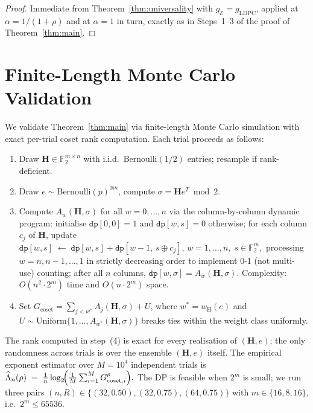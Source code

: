 \documentclass[journal,10pt,onecolumn]{IEEEtran}
\newcommand{\wH}{w_{\mathrm{H}}}
\newcommand{\Hm}{\mathbf{H}}
\begin{document}
\begin{proof}
Immediate from Theorem~\ref{thm:universality} with
$g_{\mathcal{E}}=g_{\mathrm{LDPC}}$, applied at $\alpha=1/(1+\rho)$ and at
$\alpha=1$ in turn, exactly as in Steps~1--3 of the proof of
Theorem~\ref{thm:main}.
\end{proof}

\section{Finite-Length Monte Carlo Validation}
\label{sec:numerical}

We validate Theorem~\ref{thm:main} via finite-length Monte Carlo
simulation with exact per-trial coset rank computation.
Each trial proceeds as follows:
\begin{enumerate}
\item Draw $\Hm\in\mathbb{F}_2^{m\times n}$ with i.i.d.\
      Bernoulli$(1/2)$ entries; resample if rank-deficient.
\item Draw $e\sim\mathrm{Bernoulli}(p)^{\otimes n}$, compute
      $\sigma=\Hm e^{T}\bmod 2$.
\item Compute $A_w(\Hm,\sigma)$ for all $w=0,\ldots,n$ via the
      column-by-column dynamic program: initialise
      $\mathtt{dp}[0,0]=1$ and $\mathtt{dp}[w,s]=0$ otherwise;
      for each column $c_j$ of $\Hm$, update
      \(
        \mathtt{dp}[w,s]
        \;\leftarrow\;
        \mathtt{dp}[w,s]+\mathtt{dp}[w-1,\,s\oplus c_j],
        \, w=1,\ldots,n,\; s\in\mathbb{F}_2^m,
      \)
            processing $w=n,n{-}1,\ldots,1$ in strictly
        decreasing order to implement 0-1 (not multi-use)
        counting; after all $n$ columns,
      $\mathtt{dp}[w,\sigma]=A_w(\Hm,\sigma)$.
      Complexity: $O(n^2\cdot 2^m)$ time and $O(n\cdot 2^m)$ space.
\item Set $G_{\mathrm{coset}}=\sum_{j<w^*}A_j(\Hm,\sigma)+U$,
      where $w^*=\wH(e)$ and
      $U\sim\mathrm{Uniform}\{1,\ldots,A_{w^*}(\Hm,\sigma)\}$
      breaks ties within the weight class uniformly.
\end{enumerate}
The rank computed in step~(4) is exact for every realisation of
$(\Hm,e)$; the only randomness across trials is over the
ensemble $(\Hm,e)$ itself.
The empirical exponent estimator over $M=10^4$ independent trials is
\(
  \widehat{\Lambda}_n(\rho)
  \;=\;
  \frac{1}{n}\log_2\!\Bigl(\tfrac{1}{M}
  \sum_{i=1}^{M}G_{\mathrm{coset},i}^{\rho}\Bigr).
\)
The DP is feasible when $2^m$ is small; we run three pairs
$(n,R)\in\{(32,0.50),(32,0.75),(64,0.75)\}$
with $m\in\{16,8,16\}$, i.e.\ $2^m\leq 65536$.
\end{document}
